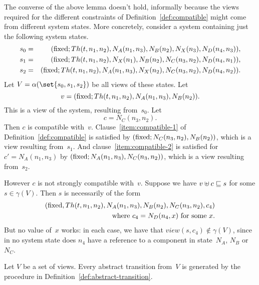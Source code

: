 The converse of the above lemma doesn't hold, informally because the views
required for the different constraints of Definition~\ref{def:compatible}
might come from different system states.  More concretely, consider a system
containing just the following system states.
%
\begin{eqnarray*}
s_0 & = &
   (\mathrm{fixed}; Th(t,n_1,n_2), N_A(n_1,n_3), N_B(n_2), N_X(n_3), N_D(n_4,n_3)), \\
s_1 & = &
  (\mathrm{fixed}; Th(t,n_1,n_2), N_X(n_1), N_B(n_2), N_C(n_3,n_2), N_D(n_4,n_1)),\\
s_2 & = & 
  (\mathrm{fixed}; Th(t,n_1,n_2), N_A(n_1,n_3), N_X(n_2), N_C(n_3,n_2), N_D(n_4,n_2)).
\end{eqnarray*}
%
Let $V = \alpha(\set{s_0,s_1,s_2})$ be all views of these states.  Let
\[
v = (\mathrm{fixed}; Th(t,n_1,n_2), N_A(n_1, n_3), N_B(n_2)).
\]
This is a view of the system, resulting from~$s_0$.  Let 
\[
c = N_C(n_3,n_2).
\]  
Then  $c$ is compatible with~$v$.
%
Clause~\ref{item:compatible-1} of Definition~\ref{def:compatible} is satisfied
by $(\mathrm{fixed}; N_C(n_3,n_2), N_B(n_2))$, which is a view resulting
from~$s_1$.
%
And clause~\ref{item:compatible-2} is satisfied for $c' = N_A(n_1,n_3)$ by
$(\mathrm{fixed}; N_A(n_1, n_3), N_C(n_3,n_2))$, which is a view resulting
from~$s_2$. 


However $c$ is not strongly compatible with~$v$.  Suppose we have \( v \uplus
c \sqsubseteq s \) for some $s \in \gamma(V)$.  Then $s$ is necessarily of the form
\[
\begin{align}
(\mathrm{fixed}, Th(t,n_1,n_2), N_A(n_1, n_3), N_B(n_2), N_C(n_3,n_2), c_4) \\
\qquad \mbox{where $c_4 = N_D(n_4,x)$ for some $x$.}
\end{align}
\]
But no value of~$x$ works: in each case, we have that $view(s, c_4) \nin
\gamma(V)$, since in no system state does $n_4$ have a reference to a
component in state~$N_A$, $N_B$ or~$N_C$.



\begin{lemma}
Let $V$ be a set of views.  Every abstract transition from~$V$ is generated by
the procedure in Definition~\ref{def:abstract-transition}.
\end{lemma}

